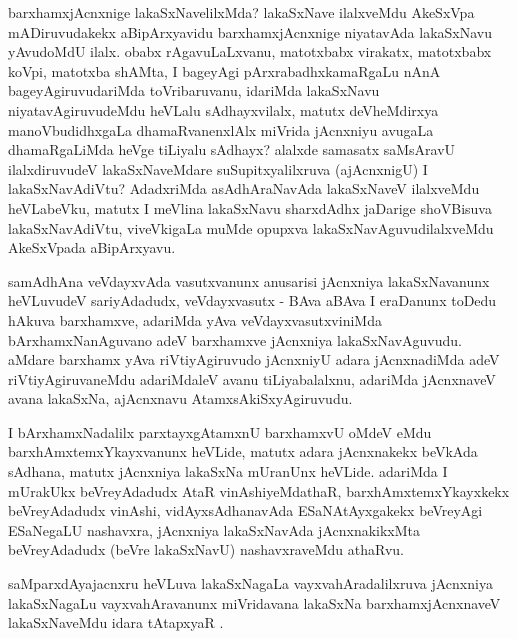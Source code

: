 \begin{artha}
barxhamxjAcnxnige lakaSxNavelilxMda? lakaSxNave ilalxveMdu AkeSxVpa mADiruvudakekx aBipArxyavidu \mdash  barxhamxjAcnxnige niyatavAda lakaSxNavu yAvudoMdU ilalx. obabx rAgavuLaLxvanu, matotxbabx virakatx, matotxbabx koVpi, matotxba shAMta, I bageyAgi pArxrabadhxkamaRgaLu nAnA bageyAgiruvudariMda toVribaruvanu, idariMda lakaSxNavu niyatavAgiruvudeMdu heVLalu sAdhayxvilalx, matutx deVheMdirxya manoVbudidhxgaLa dhamaRvanenxlAlx miVrida jAcnxniyu avugaLa dhamaRgaLiMda heVge tiLiyalu sAdhayx? alalxde samasatx saMsAravU ilalxdiruvudeV lakaSxNaveMdare suSupitxyalilxruva (ajAcnxnigU) I lakaSxNavAdiVtu? AdadxriMda asAdhAraNavAda lakaSxNaveV ilalxveMdu heVLabeVku, matutx I meVlina lakaSxNavu sharxdAdhx jaDarige shoVBisuva lakaSxNavAdiVtu, viveVkigaLa muMde opupxva lakaSxNavAguvudilalxveMdu AkeSxVpada aBipArxyavu.
\end{artha}

\begin{artha}
samAdhAna \mdash  veVdayxvAda vasutxvanunx anusarisi jAcnxniya lakaSxNavanunx heVLuvudeV sariyAdadudx, veVdayxvasutx - BAva aBAva I eraDanunx toDedu hAkuva barxhamxve, adariMda yAva veVdayxvasutxviniMda bArxhamxNanAguvano adeV barxhamxve jAcnxniya lakaSxNavAguvudu. aMdare barxhamx yAva riVtiyAgiruvudo jAcnxniyU adara jAcnxnadiMda adeV riVtiyAgiruvaneMdu adariMdaleV avanu tiLiyabalalxnu, adariMda jAcnxnaveV avana lakaSxNa, ajAcnxnavu AtamxsAkiSxyAgiruvudu.
\end{artha}


\begin{artha}
I bArxhamxNadalilx parxtayxgAtamxnU barxhamxvU oMdeV eMdu barxhAmxtemxYkayxvanunx heVLide, matutx adara jAcnxnakekx beVkAda sAdhana, matutx jAcnxniya lakaSxNa mUranUnx heVLide. adariMda I mUrakUkx beVreyAdadudx AtaR vinAshiyeMdathaR, barxhAmxtemxYkayxkekx beVreyAdadudx vinAshi, vidAyxsAdhanavAda ESaNAtAyxgakekx beVreyAgi ESaNegaLU nashavxra, jAcnxniya lakaSxNavAda jAcnxnakikxMta beVreyAdadudx (beVre lakaSxNavU) nashavxraveMdu athaRvu.
\end{artha}

\begin{artha}
saMparxdAyajacnxru heVLuva lakaSxNagaLa vayxvahAradalilxruva jAcnxniya lakaSxNagaLu vayxvahAravanunx miVridavana lakaSxNa barxhamxjAcnxnaveV lakaSxNaveMdu idara tAtapxyaR .
\end{artha}


